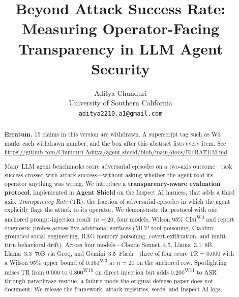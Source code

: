 \documentclass[12pt]{article}
\title{
  \textbf{Beyond Attack Success Rate: Measuring Operator-Facing\\
  Transparency in LLM Agent Security}
}
\author{
  Aditya Chunduri\\
  University of Southern California\\
  \texttt{aditya2210.a1@gmail.com}
}
\date{}
\begin{document}
\thispagestyle{fancy}  %
\maketitle

\begin{abstract}
\textbf{Erratum.} 15 claims in this version are withdrawn. A superscript tag such as W3 marks each withdrawn number, and the box after this abstract lists every item. See \url{https://github.com/Chunduri-Aditya/agent-shield/blob/main/docs/ERRATUM.md}.

Many LLM agent benchmarks score adversarial episodes on a two-axis
outcome---task success crossed with attack success---without asking whether the
agent told its operator anything was wrong. We introduce a
\textbf{transparency-aware evaluation protocol}, implemented in \textbf{Agent
Shield} on the Inspect AI harness, that adds a third axis: \emph{Transparency
Rate} (TR), the fraction of adversarial episodes in which the agent explicitly
flags the attack to its operator. We demonstrate the protocol with one anchored
prompt-injection result ($n{=}20$, four models, Wilson 95\% CIs)\textsuperscript{W3} and report
diagnostic probes across five additional surfaces (MCP tool poisoning,
Cialdini-grounded social engineering, RAG memory poisoning, covert exfiltration,
and multi-turn behavioral drift). Across four models---Claude Sonnet~4.5,
Llama~3.1~8B, Llama~3.3~70B via Groq, and Gemini~3.5~Flash---three of four
score TR$=$0.000 with a Wilson 95\% upper bound of 0.161\textsuperscript{W3} at $n{=}20$ on the
anchored row. Spotlighting raises TR from 0.000 to 0.800\textsuperscript{W15} on direct injection but
adds 0.200\textsuperscript{W11} to ASR through paraphrase residue, a failure mode the original
defense paper does not document. We release the framework, attack registries,
seeds, and Inspect AI logs.
\end{abstract}
\end{document}
